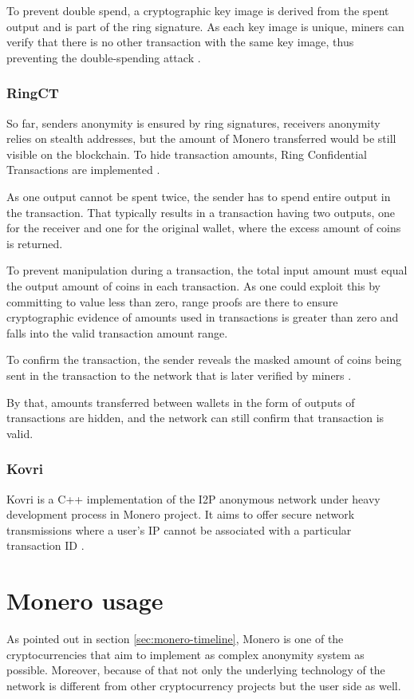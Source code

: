 \documentclass[
  printed, %
  table,   %
  nolof,     %
  nolot,     %
           oneside, color
]{fithesis3}
\begin{document}
To prevent double spend, a cryptographic key image is derived from the spent output and is part of the ring signature. As each key image is unique, miners can verify that there is no other transaction with the same key image, thus preventing the double-spending attack \cite{miller2017empirical}.

\subsection{RingCT}
\label{sec:ringct}
So far, senders anonymity is ensured by ring signatures, receivers anonymity relies on stealth addresses, but the amount of Monero transferred would be still visible on the blockchain. To hide transaction amounts, Ring Confidential Transactions are implemented \cite{noether2015ring}.

As one output cannot be spent twice, the sender has to spend entire output in the transaction. That typically results in a transaction having two outputs, one for the receiver and one for the original wallet, where the excess amount of coins is returned.	 

To prevent manipulation during a transaction, the total input amount must equal the output amount of coins in each transaction. As one could exploit this by committing to value less than zero, range proofs are there to ensure cryptographic evidence of amounts used in transactions is greater than zero and falls into the valid transaction amount range. 

To confirm the transaction, the sender reveals the masked amount of coins being sent in the transaction to the network that is later verified by miners \cite{sun2017ringct}. 

By that, amounts transferred between wallets in the form of outputs of transactions are hidden, and the network can still confirm that transaction is valid.

\subsection{Kovri}
Kovri is a C++ implementation of the I2P anonymous network under heavy development process in Monero project. It aims to offer secure network transmissions where a user's IP cannot be associated with a particular transaction ID \cite{monerokovri}. 

\chapter{Monero usage}
As pointed out in section \ref{sec:monero-timeline}, Monero is one of the cryptocurrencies that aim to implement as complex anonymity system as possible. Moreover, because of that not only the underlying technology of the network is different from other cryptocurrency projects but the user side as well. 
\end{document}
